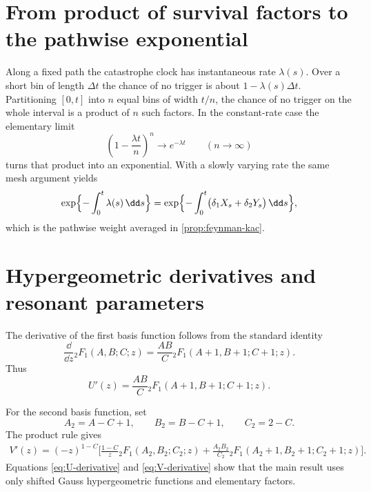 
\begingroup
\omitfromtoc
\renewcommand{\theHsection}{\thechapter.appendix.\Alph{section}}
\renewcommand{\theHsubsection}{\theHsection.\arabic{subsection}}
\renewcommand{\theHsubsubsection}{\theHsubsection.\arabic{subsubsection}}
\renewcommand{\thesection}{\thechapter.\Alph{section}}
\setcounter{section}{0}


\section{From product of survival factors to the pathwise exponential}
\label{app:product-to-exponential}

Along a fixed path the catastrophe clock has instantaneous rate $\lambda(s)$. Over a short bin of length $\Delta t$ the chance of no trigger is about $1-\lambda(s)\Delta t$. Partitioning $[0,t]$ into $n$ equal bins of width $t/n$, the chance of no trigger on the whole interval is a product of $n$ such factors. In the constant-rate case the elementary limit
\[
\left(1-\frac{\lambda t}{n}\right)^{n}\longrightarrow e^{-\lambda t}
\qquad(n\to\infty)
\]
turns that product into an exponential. With a slowly varying rate the same mesh argument yields
\[
\exp\Bigl\{-\int_0^t\lambda(s)\,\dd s\Bigr\}
=\exp\Bigl\{-\int_0^t\bigl(\delta_1X_s+\delta_2Y_s\bigr)\,\dd s\Bigr\},
\]
which is the pathwise weight averaged in \cref{prop:feynman-kac}.

\section{Hypergeometric derivatives and resonant parameters}
\label{app:hypergeometric-details}

The derivative of the first basis function follows from the standard identity
\[
\frac{\dd}{\dd z}{}_2F_1(A,B;C;z)
=\frac{AB}{C}{}_2F_1(A+1,B+1;C+1;z).
\]
Thus
\begin{equation}
\label{eq:U-derivative}
U'(z)=\frac{AB}{C}
{}_2F_1(A+1,B+1;C+1;z).
\end{equation}

For the second basis function, set
\begin{equation*}
A_2=A-C+1,
\qquad
B_2=B-C+1,
\qquad
C_2=2-C.
\end{equation*}
The product rule gives
\begin{equation}
\label{eq:V-derivative}
\begin{aligned}
V'(z)=(-z)^{1-C}\Biggl[
\frac{1-C}{z}{}_2F_1(A_2,B_2;C_2;z)
+\frac{A_2B_2}{C_2}
{}_2F_1(A_2+1,B_2+1;C_2+1;z)
\Biggr].
\end{aligned}
\end{equation}
Equations \eqref{eq:U-derivative} and \eqref{eq:V-derivative} show that the main result uses only shifted Gauss hypergeometric functions and elementary factors.

